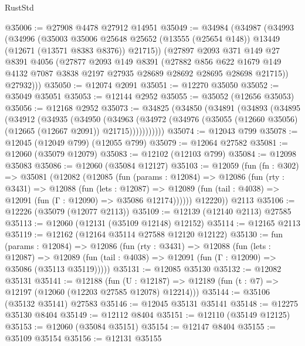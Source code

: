 \begin{lexlean}{RustStd}
\begin{coremodule}
@35006 := @27908 @4478 @27912 @14951
@35049 := @34984
    (@34987
      (@34993
        (@34996
          (@35003
            @35006
            @25648
            @25652
            (@13555 (@25654 @148))
            @13449
            (@12671 (@13571 @8383 @8376))
            @21715))
        (@27897
          @2093
          @371
          @149
          @27
          @8391
          @4056
          (@27877
            @2093
            @149
            @8391
            (@27882
              @856
              @622
              @1679
              @149
              @4132
              @7087
              @3838
              @2197
              @27935
              @28689
              @28692
              @28695
              @28698
              @21715))
          @27932)))
@35050 := @12074 @2091
@35051 := @12270 @35050
@35052 := @35049 @35051
@35053 := @12144 @2952
@35055 := @35052 (@12656 @35053)
@35056 := @12168 @2952
@35073 := @34825
    (@34850
      (@34891
        (@34893
          (@34895
            (@34912
              (@34935
                (@34950
                  (@34963
                    (@34972
                      (@34976 (@35055 (@12660 @35056) (@12665 (@12667 @2091)) @21715)))))))))))
@35074 := @12043 @799
@35078 := @12045 (@12049 @799) (@12055 @799)
@35079 := @12064 @27582
@35081 := @12060 (@35079 @12079)
@35083 := @12102 (@12103 @799)
@35084 := @12098 @35083
@35086 := @12060 (@35084 @12127)
@35103 := @12059
    (fun (fn : @302) =>
    @35081
      (@12082
        (@12085
          (fun (params : @12084) =>
          @12086
            (fun (rty : @3431) =>
            @12088
              (fun (lets : @12087) =>
              @12089 (fun (tail : @4038) => @12091 (fun (Γ : @12090) => @35086 @12174))))))
        @12220))
    @2113
@35106 := @12226 (@35079 (@12077 @2113))
@35109 := @12139 (@12140 @2113) @27585
@35113 := @12060 (@12131 (@35109 @12148) @12152)
@35114 := @12165 @2113
@35119 := @12162 (@12164 @35114 @27588 @12120 @12122)
@35130 := fun (params : @12084) =>
  @12086
    (fun (rty : @3431) =>
    @12088
      (fun (lets : @12087) =>
      @12089 (fun (tail : @4038) => @12091 (fun (Γ : @12090) => @35086 (@35113 @35119)))))
@35131 := @12085 @35130
@35132 := @12082 @35131
@35141 := @12188
    (fun (U : @12187) => @12189 (fun (t : @7) => @12197 (@12060 (@12203 @27585 @12078) @12214)))
@35144 := @35106 (@35132 @35141) @27583
@35146 := @12045 @35131 @35141
@35148 := @12275 @35130 @8404
@35149 := @12112 @8404
@35151 := @12110 (@35149 @12125)
@35153 := @12060 (@35084 @35151)
@35154 := @12147 @8404
@35155 := @35109 @35154
@35156 := @12131 @35155

\end{coremodule}
\end{lexlean}
